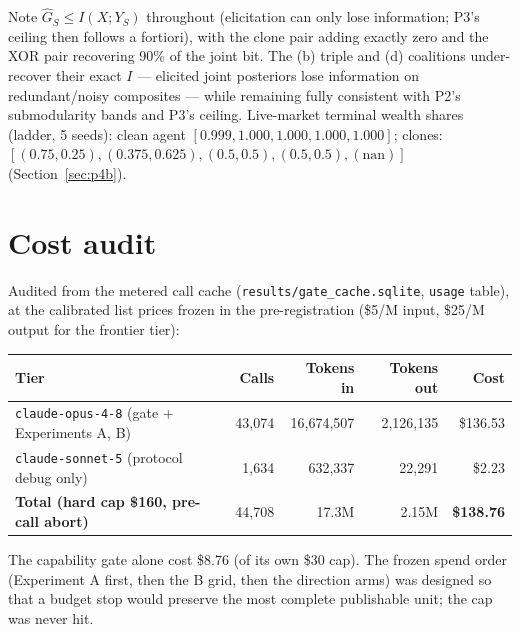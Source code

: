 \documentclass{article} %
\newcommand{\Ghat}{\hat{G}}
\begin{document}
Note $\Ghat_S \leq I(X;Y_S)$ throughout (elicitation can only lose information; P3's ceiling then follows a fortiori), with the clone pair adding exactly zero and the XOR pair recovering 90\% of the joint bit. The (b) triple and (d) coalitions under-recover their exact $I$ --- elicited joint posteriors lose information on redundant/noisy composites --- while remaining fully consistent with P2's submodularity bands and P3's ceiling. Live-market terminal wealth shares (ladder, 5 seeds): clean agent $[0.999, 1.000, 1.000, 1.000, 1.000]$; clones: $[(0.75, 0.25), (0.375, 0.625), (0.5, 0.5), (0.5, 0.5), (\mathrm{nan})]$ (Section~\ref{sec:p4b}).

\section{Cost audit}
\label{app:cost}

Audited from the metered call cache (\texttt{results/gate\_cache.sqlite}, \texttt{usage} table), at the calibrated list prices frozen in the pre-registration (\$5/M input, \$25/M output for the frontier tier):

\begin{center}
\small
\begin{tabular}{@{}lrrrr@{}}
\toprule
Tier & Calls & Tokens in & Tokens out & Cost \\
\midrule
\texttt{claude-opus-4-8} (gate + Experiments A, B) & 43{,}074 & 16{,}674{,}507 & 2{,}126{,}135 & \$136.53 \\
\texttt{claude-sonnet-5} (protocol debug only) & 1{,}634 & 632{,}337 & 22{,}291 & \$2.23 \\
\midrule
\textbf{Total (hard cap \$160, pre-call abort)} & 44{,}708 & 17.3M & 2.15M & \textbf{\$138.76} \\
\bottomrule
\end{tabular}
\end{center}

The capability gate alone cost \$8.76 (of its own \$30 cap). The frozen spend order (Experiment A first, then the B grid, then the direction arms) was designed so that a budget stop would preserve the most complete publishable unit; the cap was never hit.
\end{document}

